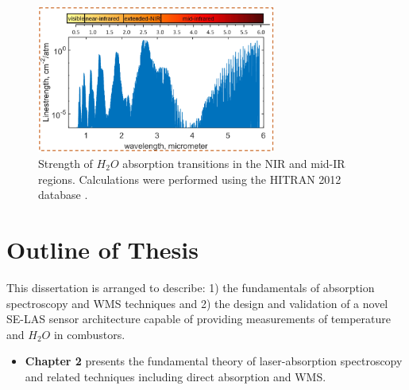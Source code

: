 \vspace{5mm}

\begin{figure}[ht]
    \centering
        \includegraphics[width=0.7\textwidth]{fig/ch1_fig7.png}
        \caption{Strength of $H_2O$ absorption transitions in the NIR and mid-IR regions. Calculations were performed using the HITRAN 2012 database \cite{2013JQSRT.130....4R}.}
    \label{fig:ch1_7}
\end{figure}


\section{Outline of Thesis}
This dissertation is arranged to describe: 1) the fundamentals of absorption spectroscopy and WMS techniques and 2) the design and validation of a novel SE-LAS sensor architecture capable of providing measurements of temperature and $H_2O$ in combustors.

\begin{itemize}
\item \textbf{Chapter 2} presents the fundamental theory of laser-absorption spectroscopy and related techniques including direct absorption and WMS. 
\end{itemize}

